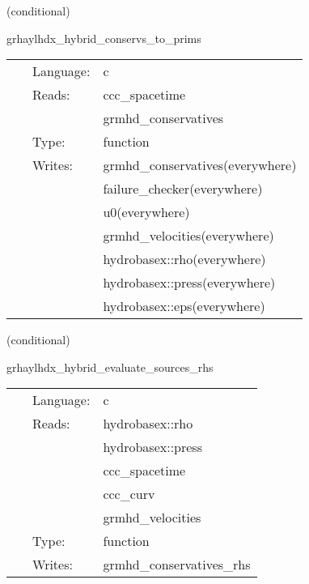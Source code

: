 \documentclass{article}
\begin{document}
\vspace{5mm}

   (conditional) 

\hspace{5mm} grhaylhdx\_hybrid\_conservs\_to\_prims 

\hspace{5mm}{\it hybrid version of grhaylhdx\_conservs\_to\_prims } 


\hspace{5mm}

 \begin{tabular*}{160mm}{cll} 
~ & Language:  & c \\ 
~ & Reads:  & ccc\_spacetime \\ 
~& ~ &grmhd\_conservatives\\ 
~ & Type:  & function \\ 
~ & Writes:  & grmhd\_conservatives(everywhere) \\ 
~& ~ &failure\_checker(everywhere)\\ 
~& ~ &u0(everywhere)\\ 
~& ~ &grmhd\_velocities(everywhere)\\ 
~& ~ &hydrobasex::rho(everywhere)\\ 
~& ~ &hydrobasex::press(everywhere)\\ 
~& ~ &hydrobasex::eps(everywhere)\\ 
\end{tabular*} 


\vspace{5mm}

   (conditional) 

\hspace{5mm} grhaylhdx\_hybrid\_evaluate\_sources\_rhs 

\hspace{5mm}{\it hybrid version of grhaylhdx\_evaluate\_sources\_rhs } 


\hspace{5mm}

 \begin{tabular*}{160mm}{cll} 
~ & Language:  & c \\ 
~ & Reads:  & hydrobasex::rho \\ 
~& ~ &hydrobasex::press\\ 
~& ~ &ccc\_spacetime\\ 
~& ~ &ccc\_curv\\ 
~& ~ &grmhd\_velocities\\ 
~ & Type:  & function \\ 
~ & Writes:  & grmhd\_conservatives\_rhs \\ 
\end{tabular*} 
\end{document}
